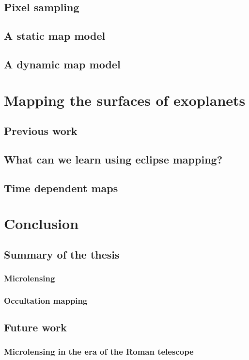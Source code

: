 \documentclass[12pt,dvipsnames]{report}
\begin{document}
\section{Pixel sampling}
\section{A static map model}
\section{A dynamic map model}

\chapter{Mapping the surfaces of exoplanets}
\label{ch:mapping_exoplanets}
\section{Previous work}
\section{What can we learn using eclipse mapping?}
\section{Time dependent maps}

\chapter{Conclusion}
\section{Summary of the thesis}
\subsection{Microlensing}
\subsection{Occultation mapping}
\section{Future work}
\subsection{Microlensing in the era of the Roman telescope}
\end{document}
